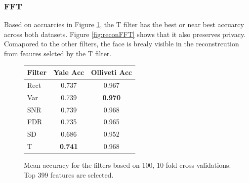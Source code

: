 \documentclass{article}
\begin{document}
\subsubsection{FFT}

Based on accuarcies in Figure \ref{fig:accFFT}, the T filter has the best or near best 
accuarcy across both datasets. Figure \ref{fig:reconFFT} shows that it also preserves privacy. 
Comapored to the other filters, the face is brealy visible in the reconstrcution from feaures selcted 
by the T filter. 

\begin{figure}[!htb]

\begin{minipage}[b]{1.0\linewidth}
  \centering
    \begin{tabular}{ | l || c | c |}
    \hline
    Filter & Yale Acc & Olliveti Acc \\ \hline
    Rect & 0.737 & 0.967 \\ \hline
    Var & 0.739 & \textbf{0.970} \\ \hline 
    SNR & 0.739 & 0.968 \\ \hline
    FDR & 0.735 & 0.965 \\ \hline
    SD & 0.686 & 0.952 \\ \hline
    T & \textbf{0.741} & 0.968 \\
    \hline
    \end{tabular}
\end{minipage}
%
\caption{Mean accuracy for the filters based on 100, 10 fold cross validations. Top 399 features are
selected.}
\label{fig:accFFT}
%
\end{figure}
\end{document}
